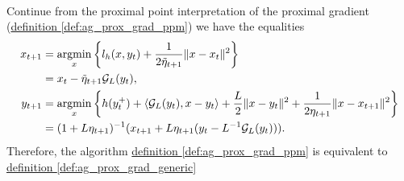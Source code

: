         \begin{proposition}
        \label{prop:derive_ag_prox_grad_tript}
            \quad \\
            Continue from the proximal point interpretation of the proximal gradient 
            (\hyperref[def:ag_prox_grad_ppm]{definition \ref*{def:ag_prox_grad_ppm}})
            we have the equalities 
            \begin{align*}
                x_{t + 1} &= \mathop{\rm argmin}\limits_{x}
                \left\lbrace
                    l_h(x, y_t) + \frac{1}{2\tilde \eta_{t + 1}} \Vert x - x_t\Vert^2
                \right\rbrace
                \\
                &= x_t - \tilde\eta_{t + 1} \mathcal G_L(y_t), 
                \\
                y_{t + 1} &= \mathop{\rm argmin}\limits_{x}
                \left\lbrace
                        h(y_t^+) + \langle \mathcal G_L(y_t), x - y_t\rangle + \frac{L}{2}\Vert x -y_t\Vert^2 + \frac{1}{2\eta_{t + 1}}\Vert x - x_{t + 1}\Vert^2
                \right\rbrace
                \\
                &= (1 + L\eta_{t + 1})^{-1}
                (x_{t + 1} + L\eta_{t + 1}(y_t - L^{-1}\mathcal  G_L(y_t))). 
            \end{align*}
            Therefore, the algorithm 
            \hyperref[def:ag_prox_grad_ppm]{definition \ref*{def:ag_prox_grad_ppm}}
            is equivalent to 
            \hyperref[def:ag_prox_grad_generic]{definition \ref*{def:ag_prox_grad_generic}}
        \end{proposition}
